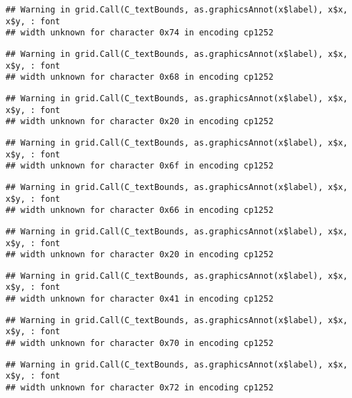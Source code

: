 \documentclass[
]{article}
\begin{document}
\begin{verbatim}
## Warning in grid.Call(C_textBounds, as.graphicsAnnot(x$label), x$x, x$y, : font
## width unknown for character 0x74 in encoding cp1252
\end{verbatim}

\begin{verbatim}
## Warning in grid.Call(C_textBounds, as.graphicsAnnot(x$label), x$x, x$y, : font
## width unknown for character 0x68 in encoding cp1252
\end{verbatim}

\begin{verbatim}
## Warning in grid.Call(C_textBounds, as.graphicsAnnot(x$label), x$x, x$y, : font
## width unknown for character 0x20 in encoding cp1252
\end{verbatim}

\begin{verbatim}
## Warning in grid.Call(C_textBounds, as.graphicsAnnot(x$label), x$x, x$y, : font
## width unknown for character 0x6f in encoding cp1252
\end{verbatim}

\begin{verbatim}
## Warning in grid.Call(C_textBounds, as.graphicsAnnot(x$label), x$x, x$y, : font
## width unknown for character 0x66 in encoding cp1252
\end{verbatim}

\begin{verbatim}
## Warning in grid.Call(C_textBounds, as.graphicsAnnot(x$label), x$x, x$y, : font
## width unknown for character 0x20 in encoding cp1252
\end{verbatim}

\begin{verbatim}
## Warning in grid.Call(C_textBounds, as.graphicsAnnot(x$label), x$x, x$y, : font
## width unknown for character 0x41 in encoding cp1252
\end{verbatim}

\begin{verbatim}
## Warning in grid.Call(C_textBounds, as.graphicsAnnot(x$label), x$x, x$y, : font
## width unknown for character 0x70 in encoding cp1252
\end{verbatim}

\begin{verbatim}
## Warning in grid.Call(C_textBounds, as.graphicsAnnot(x$label), x$x, x$y, : font
## width unknown for character 0x72 in encoding cp1252
\end{verbatim}
\end{document}
